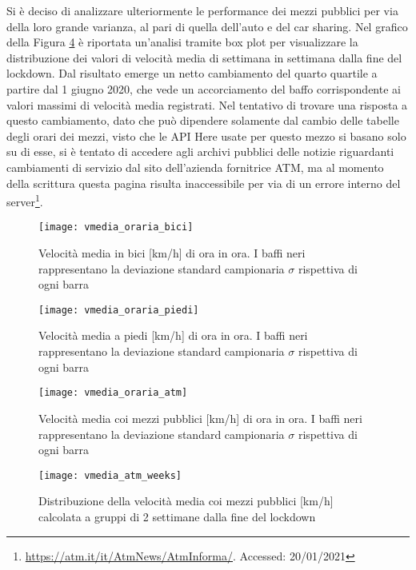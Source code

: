 Si è deciso di analizzare ulteriormente le performance dei mezzi pubblici per via della loro grande varianza, al pari di quella dell'auto e del car sharing. Nel grafico della Figura \ref{image:29} è riportata un'analisi tramite box plot per visualizzare la distribuzione dei valori di velocità media di settimana in settimana dalla fine del lockdown. Dal risultato emerge un netto cambiamento del quarto quartile a partire dal 1 giugno 2020, che vede un accorciamento del baffo corrispondente ai valori massimi di velocità media registrati. Nel tentativo di trovare una risposta a questo cambiamento, dato che può dipendere solamente dal cambio delle tabelle degli orari dei mezzi, visto che le API Here usate per questo mezzo si basano solo su di esse, si è tentato di accedere agli archivi pubblici delle notizie riguardanti cambiamenti di servizio dal sito dell'azienda fornitrice ATM, ma al momento della scrittura questa pagina risulta inaccessibile per via di un errore interno del server\footnote{\url{https://atm.it/it/AtmNews/AtmInforma/}. Accessed: 20/01/2021}.

\begin{figure}[H]
	\centering
	\texttt{[image: vmedia\_oraria\_bici]}
	\caption{Velocità media in bici [km/h] di ora in ora. I baffi neri rappresentano la deviazione standard campionaria $\sigma$ rispettiva di ogni barra}
	\label{image:11}
\end{figure}

\begin{figure}[H]
	\centering
	\texttt{[image: vmedia\_oraria\_piedi]}
	\caption{Velocità media a piedi [km/h] di ora in ora. I baffi neri rappresentano la deviazione standard campionaria $\sigma$ rispettiva di ogni barra}
	\label{image:18}
\end{figure}

\begin{figure}
\centering
\texttt{[image: vmedia\_oraria\_atm]}
\caption{Velocità media coi mezzi pubblici [km/h] di ora in ora. I baffi neri rappresentano la deviazione standard campionaria $\sigma$ rispettiva di ogni barra}
\label{image:17}
\end{figure}

\begin{figure}
\centering
\texttt{[image: vmedia\_atm\_weeks]}
\caption{Distribuzione della velocità media coi mezzi pubblici [km/h] calcolata a gruppi di 2 settimane dalla fine del lockdown}
\label{image:29}
\end{figure}


